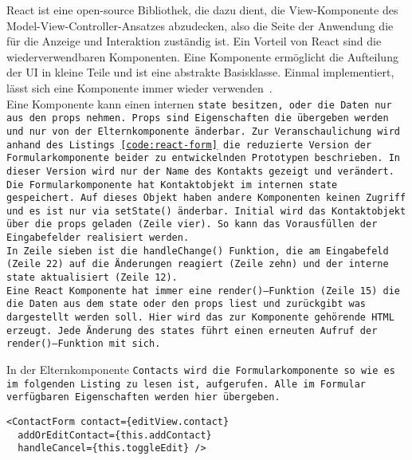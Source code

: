 React ist eine open-source Bibliothek, die dazu dient, die View-Komponente des Model-View-Controller-Ansatzes abzudecken, also die Seite der Anwendung die für die Anzeige und Interaktion zuständig ist. Ein Vorteil von React sind die wiederverwendbaren Komponenten. Eine Komponente ermöglicht die Aufteilung der \gls{UI} in kleine Teile und ist eine abstrakte Basisklasse. Einmal implementiert, lässt sich eine Komponente immer wieder verwenden~\cite{react}.\\
Eine Komponente kann einen internen \tt{state} besitzen, oder die Daten nur aus den \tt{props} nehmen. \tt{Props} sind Eigenschaften die übergeben werden und nur von der Elternkomponente änderbar.
Zur Veranschaulichung wird anhand des Listings \ref{code:react-form} die reduzierte Version der Formularkomponente beider zu entwickelnden Prototypen beschrieben. In dieser Version wird nur der Name des Kontakts gezeigt und verändert.\\
Die Formularkomponente hat Kontaktobjekt im internen \tt{state} gespeichert. Auf dieses Objekt haben andere Komponenten keinen Zugriff und es ist nur via \tt{setState()} änderbar.
Initial wird das Kontaktobjekt über die \tt{props} geladen (Zeile vier). So kann das Vorausfüllen der Eingabefelder realisiert werden.\\
In Zeile sieben ist die \tt{handleChange()} Funktion, die am Eingabefeld (Zeile 22) auf die Änderungen reagiert (Zeile zehn) und der interne \tt{state} aktualisiert (Zeile 12).\\
Eine React Komponente hat immer eine \tt{render()}--Funktion (Zeile 15) die die Daten aus dem \tt{state} oder den \tt{props} liest und zurückgibt was dargestellt werden soll. Hier wird das zur Komponente gehörende \gls{HTML} erzeugt. Jede Änderung des \tt{states} führt einen erneuten Aufruf der \tt{render()}--Funktion mit sich.
\begin{center}

\end{center}
In der Elternkomponente \tt{Contacts} wird die Formularkomponente so wie es im folgenden Listing zu lesen ist, aufgerufen. Alle im Formular verfügbaren Eigenschaften werden hier übergeben.
\begin{lstlisting}
<ContactForm contact={editView.contact}
  addOrEditContact={this.addContact}
  handleCancel={this.toggleEdit} />
\end{lstlisting}
